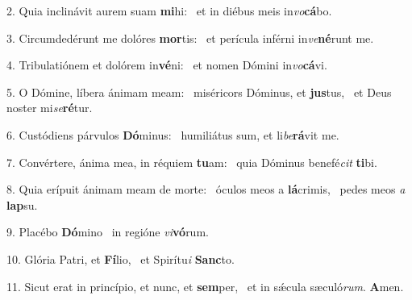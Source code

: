 2. Quia inclinávit aurem suam \textbf{mi}hi: \ast\  et in diébus meis in\textit{vo}\textbf{cá}bo.\

3. Circumdedérunt me dolóres \textbf{mor}tis: \ast\  et perícula inférni in\textit{ve}\textbf{né}runt me.\

4. Tribulatiónem et dolórem in\textbf{vé}ni: \ast\  et nomen Dómini in\textit{vo}\textbf{cá}vi.\

5. O Dómine, líbera ánimam meam: \dag\  miséricors Dóminus, et \textbf{jus}tus, \ast\  et Deus noster mi\textit{se}\textbf{ré}tur.\

6. Custódiens párvulos \textbf{Dó}minus: \ast\  humiliátus sum, et li\textit{be}\textbf{rá}vit me.\

7. Convértere, ánima mea, in réquiem \textbf{tu}am: \ast\  quia Dóminus benefé\textit{cit} \textbf{ti}bi.\

8. Quia erípuit ánimam meam de morte: \dag\  óculos meos a \textbf{lá}crimis, \ast\  pedes meos \textit{a} \textbf{lap}su.\

9. Placébo \textbf{Dó}mino \ast\  in regióne \textit{vi}\textbf{vó}rum.\

10. Glória Patri, et \textbf{Fí}lio, \ast\  et Spirítu\textit{i} \textbf{Sanc}to.\

11. Sicut erat in princípio, et nunc, et \textbf{sem}per, \ast\  et in sǽcula sæculó\textit{rum}. \textbf{A}men.\

